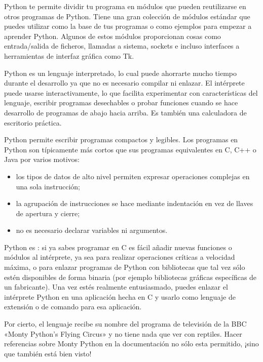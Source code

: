 \documentclass[a4,10pt,spanish]{sphinxmanual}
\begin{document}
\sphinxAtStartPar
Python te permite dividir tu programa en módulos que pueden reutilizarse en otros programas de Python. Tiene una gran colección de módulos estándar que puedes utilizar como la base de tus programas o como ejemplos para empezar a aprender Python. Algunos de estos módulos proporcionan cosas como entrada/salida de ficheros, llamadas a sistema, sockets e incluso interfaces a herramientas de interfaz gráfica como Tk.

\sphinxAtStartPar
Python es un lenguaje interpretado, lo cual puede ahorrarte mucho tiempo durante el desarrollo ya que no es necesario compilar ni enlazar. El intérprete puede usarse interactivamente, lo que facilita experimentar con características del lenguaje, escribir programas desechables o probar funciones cuando se hace desarrollo de programas de abajo hacia arriba. Es también una calculadora de escritorio práctica.

\sphinxAtStartPar
Python permite escribir programas compactos y legibles. Los programas en Python son típicamente más cortos que sus programas equivalentes en C, C++ o Java por varios motivos:
\begin{itemize}
\item {} 
\sphinxAtStartPar
los tipos de datos de alto nivel permiten expresar operaciones complejas en una sola instrucción;

\item {} 
\sphinxAtStartPar
la agrupación de instrucciones se hace mediante indentación en vez de llaves de apertura y cierre;

\item {} 
\sphinxAtStartPar
no es necesario declarar variables ni argumentos.

\end{itemize}

\sphinxAtStartPar
Python es : si ya sabes programar en C es fácil añadir nuevas funciones o módulos al intérprete, ya sea para realizar operaciones críticas a velocidad máxima, o para enlazar programas de Python con bibliotecas que tal vez sólo estén disponibles de forma binaria (por ejemplo bibliotecas gráficas específicas de un fabricante). Una vez estés realmente entusiasmado, puedes enlazar el intérprete Python en una aplicación hecha en C y usarlo como lenguaje de extensión o de comando para esa aplicación.

\sphinxAtStartPar
Por cierto, el lenguaje recibe su nombre del programa de televisión de la BBC «Monty Python’s Flying Circus» y no tiene nada que ver con reptiles. Hacer referencias sobre Monty Python en la documentación no sólo esta permitido, ¡sino que también está bien visto!
\end{document}
